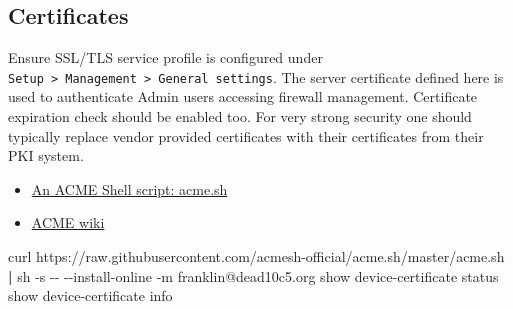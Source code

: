 \documentclass[
]{article}
\newenvironment{Shaded}{}{}
\newcommand{\ExtensionTok}[1]{#1}
\newcommand{\FunctionTok}[1]{\textcolor[rgb]{0.02,0.16,0.49}{#1}}
\newcommand{\KeywordTok}[1]{\textcolor[rgb]{0.00,0.44,0.13}{\textbf{#1}}}
\newcommand{\NormalTok}[1]{#1}
\providecommand{\tightlist}{%
  \setlength{\itemsep}{0pt}\setlength{\parskip}{0pt}}
\begin{document}
\hypertarget{certificates}{%
\subsection{Certificates}\label{certificates}}

Ensure SSL/TLS service profile is configured under
\texttt{Setup\ \textgreater{}\ Management\ \textgreater{}\ General\ settings}.
The server certificate defined here is used to authenticate Admin users
accessing firewall management. Certificate expiration check should be
enabled too. For very strong security one should typically replace
vendor provided certificates with their certificates from their PKI
system.

\begin{itemize}
\tightlist
\item
  \href{https://github.com/PaloAltoNetworks/acme.sh}{An ACME Shell
  script: acme.sh}
\item
  \href{https://github.com/acmesh-official/acme.sh/wiki}{ACME wiki}
\end{itemize}

\begin{Shaded}
\begin{Highlighting}[]
\ExtensionTok{curl}\NormalTok{ https://raw.githubusercontent.com/acmesh{-}official/acme.sh/master/acme.sh }\KeywordTok{|} \FunctionTok{sh}\NormalTok{ {-}s {-}{-} {-}{-}install{-}online {-}m  franklin@dead10c5.org}
\ExtensionTok{show}\NormalTok{ device{-}certificate status}
\ExtensionTok{show}\NormalTok{ device{-}certificate info}
\end{Highlighting}
\end{Shaded}
\end{document}
